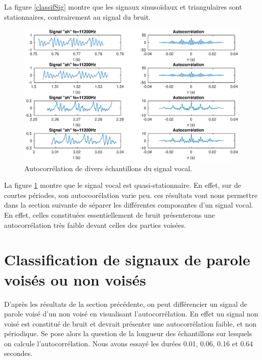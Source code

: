 \documentclass[french]{article}
\begin{document}
La figure \ref{classifSig} montre que les signaux sinusoïdaux et triangulaires sont stationnaires, contrairement au signal du bruit.

\begin{figure}[h!]
\centering
\includegraphics[width=\textwidth]{images/classificationAh.eps}
\caption{Autocorrélation de divers échantillons du signal vocal.}
\label{classifAh}
\end{figure}

La figure \ref{classifAh} montre que le signal vocal est quasi-stationnaire. En effet, sur de courtes périodes, son autocoorélation varie peu. ces résultats vont nous permettre dans la section suivante de séparer les différentes composantes d'un signal vocal. En effet, celles constituées essentiellement de bruit présenterons une autocorrélation très faible devant celles des parties voisées.

\FloatBarrier

\section{ Classification de signaux de parole voisés ou non voisés}

D'après les résultats de la section précédente, on peut différencier un signal de parole voisé d'un non voisé en visualisant l'autocorrélation. En effet un signal non voisé est constitué de bruit et devrait présenter une autocorrélation faible, et non périodique. Se pose alors la question de la longueur des échantillons sur lesquels on calcule l'autocorrélation. Nous avons essayé les durées 0.01, 0.06, 0.16 et 0.64 secondes.
\end{document}
